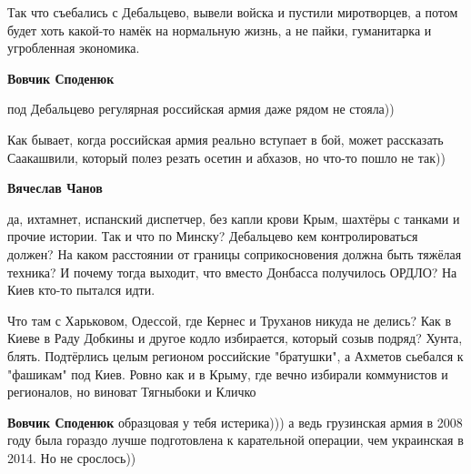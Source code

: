 \begin{itemize}
\begin{itemize}
Так что съебались с Дебальцево, вывели войска и пустили миротворцев, а потом
будет хоть какой-то намёк на нормальную жизнь, а не пайки, гуманитарка и
угробленная экономика.

 
\textbf{Вовчик Споденюк} 

под Дебальцево регулярная российская армия даже рядом не стояла))

Как бывает, когда российская армия реально вступает в бой, может рассказать
Саакашвили, который полез резать осетин и абхазов, но что-то пошло не так))


 
\textbf{Вячеслав Чанов} 

да, ихтамнет, испанский диспетчер, без капли крови Крым, шахтёры с танками и
прочие истории. Так и что по Минску? Дебальцево кем контролироваться должен? На
каком расстоянии от границы соприкосновения должна быть тяжёлая техника? И
почему тогда выходит, что вместо Донбасса получилось ОРДЛО? На Киев кто-то
пытался идти.

Что там с Харьковом, Одессой, где Кернес и Труханов никуда не делись? Как в
Киеве в Раду Добкины и другое кодло избирается, который созыв подряд? Хунта,
блять. Подтёрлись целым регионом российские "братушки", а Ахметов сьебался к
"фашикам" под Киев. Ровно как и в Крыму, где вечно избирали коммунистов и
регионалов, но виноват Тягныбоки и Кличко

 
\textbf{Вовчик Споденюк} образцовая у тебя истерика))) а ведь грузинская армия
в 2008 году была гораздо лучше подготовлена к карательной операции, чем
украинская в 2014. Но не срослось))

 

\end{itemize}
\end{itemize}
